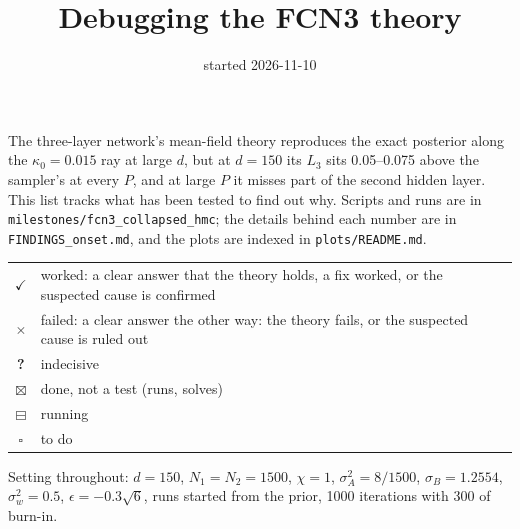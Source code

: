 \documentclass[11pt,a4paper]{article}
\title{Debugging the FCN3 theory}
\author{}
\date{started 2026-11-10}
\newcommand{\mworked}{\textcolor{worked}{\Large$\bm\checkmark$}}
\newcommand{\mfailed}{\textcolor{failed}{\Large$\bm\times$}}
\newcommand{\munclear}{\textcolor{unclear}{\Large\textbf{?}}}
\newcommand{\mrunning}{\textcolor{running}{\Large$\boxminus$}}
\newcommand{\mtodo}{\textcolor{neutral}{\Large$\square$}}
\newcommand{\msetup}{\textcolor{neutral}{\Large$\boxtimes$}}
\begin{document}
\sloppy
\maketitle

The three-layer network's mean-field theory reproduces the exact posterior along the $\kappa_0=0.015$ ray at large $d$,
but at $d=150$ its $L_3$ sits 0.05--0.075 above the sampler's at every $P$, and at large $P$ it misses part of the
second hidden layer. This list tracks what has been tested to find out why. Scripts and runs are in
\texttt{milestones/fcn3\_collapsed\_hmc}; the details behind each number are in \texttt{FINDINGS\_onset.md}, and the
plots are indexed in \texttt{plots/README.md}.

\begin{center}
\begin{tabular}{@{}cp{}@{}}
\mworked & worked: a clear answer that the theory holds, a fix worked, or the suspected cause is confirmed\\
\mfailed & failed: a clear answer the other way: the theory fails, or the suspected cause is ruled out\\
\munclear & indecisive\\
\msetup & done, not a test (runs, solves)\\
\mrunning & running\\
\mtodo & to do
\end{tabular}
\end{center}

Setting throughout: $d=150$, $N_1=N_2=1500$, $\chi=1$, $\sigma_A^2=8/1500$, $\sigma_B=1.2554$, $\sigma_w^2=0.5$,
$\epsilon=-0.3\sqrt6$, runs started from the prior, 1000 iterations with 300 of burn-in.
\end{document}
